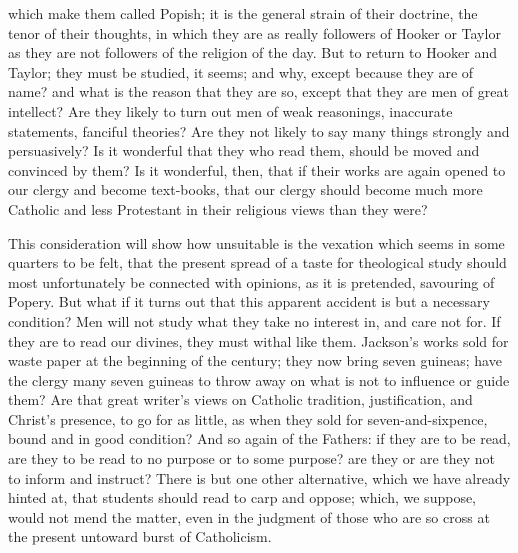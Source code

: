 which make them called Popish; it is the general strain of their
doctrine, the tenor of their thoughts, in which they are as really
followers of Hooker or Taylor as they are not followers of the
religion of the day. But to return to Hooker and Taylor; they must be
studied, it seems; and why, except because they are of name? and what
is the reason that they are so, except that they are men of great
intellect? Are they likely to turn out men of weak reasonings,
inaccurate statements, fanciful theories? Are they not likely to say
many things strongly and persuasively? Is it wonderful that they who
read them, should be moved and convinced by them? Is it wonderful,
then, that if their works are again opened to our clergy and become
text-books, that our clergy should become much more Catholic and less
Protestant in their religious views than they were?

This consideration will show how unsuitable is
the vexation which seems in some quarters to be felt, that the present
spread of a taste for theological study should most unfortunately be
connected with opinions, as it is pretended, savouring of Popery. But
what if it turns out that this apparent accident is but a necessary
condition? Men will not study what they take no interest in, and care
not for. If they are to read our divines, they must withal like them.
Jackson's works sold for waste paper at the beginning of the century;
they now bring seven guineas; have the clergy many seven guineas to
throw away on what is not to influence or guide them? Are that great
writer's views on Catholic tradition, justification, and Christ's
presence, to go for as little, as when they sold for
seven-and-sixpence, bound and in good condition? And so again of the
Fathers: if they are to be read, are they to be read to no
purpose or to some purpose? are they or are they not to inform and
instruct? There is but one other alternative, which we have already
hinted at, that students should read to carp and oppose; which, we
suppose, would not mend the matter, even in the judgment of those who
are so cross at the present untoward burst of Catholicism.

